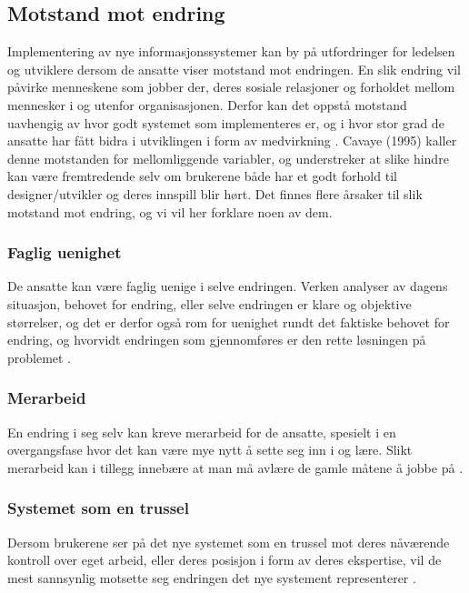 \subsection{Motstand mot endring}
\label{chp:motstand}

Implementering av nye informasjonssystemer kan by på utfordringer for ledelsen og utviklere dersom de ansatte viser motstand mot endringen. 
En slik endring vil påvirke menneskene som jobber der, deres sosiale relasjoner og forholdet mellom mennesker i og utenfor organisasjonen. Derfor kan det oppstå motstand uavhengig av hvor godt systemet som implementeres er, og i hvor stor grad de ansatte har fått bidra i utviklingen i form av medvirkning \cite{Jacobsen12}. Cavaye (1995) kaller denne motstanden for mellomliggende variabler, og understreker at slike hindre kan være fremtredende selv om brukerene både har et godt forhold til designer/utvikler og deres innspill blir hørt. Det finnes flere årsaker til slik motstand mot endring, og vi vil her forklare noen av dem. 

\subsubsection{Faglig uenighet}
De ansatte kan være faglig uenige i selve endringen. Verken analyser av dagens situasjon, behovet for endring, eller selve endringen er klare og objektive størrelser, og det er derfor også rom for uenighet rundt det faktiske behovet for endring, og hvorvidt endringen som gjennomføres er den rette løsningen på problemet \cite{Jacobsen12}.

\subsubsection{Merarbeid}
En endring i seg selv kan kreve merarbeid for de ansatte, spesielt i en overgangsfase hvor det kan være mye nytt å sette seg inn i og lære. Slikt merarbeid kan i tillegg innebære at man må avlære de gamle måtene å jobbe på \cite{Jacobsen12}.

\subsubsection{Systemet som en trussel}
Dersom brukerene ser på det nye systemet som en trussel mot deres nåværende kontroll over eget arbeid, eller deres posisjon i form av deres ekspertise, vil de mest sannsynlig motsette seg endringen det nye systement representerer \cite{Cavaye95}.

